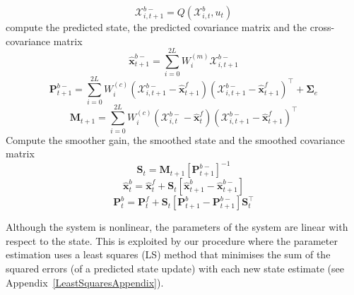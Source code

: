 \documentclass[twocolumn,11pt,a4paper]{article}		%
\begin{document}
\begin{algorithm}
\begin{small}
\begin{algorithmic}[1]
		\begin{equation*}
			\mathcal X_{i,t+1}^{b-}=Q(\mathcal X_{i,t}^b,u_t) 
		\end{equation*}
		 compute the predicted state, the predicted covariance matrix and the cross-covariance matrix
		\begin{equation*}
			\hat{\mathbf x}_{t+1}^{b-}=\sum_{i=0}^{2L} W_i^{(m)}\mathcal X_{i,t+1}^{b-} 
		\end{equation*}
		\begin{equation*}
			\mathbf P_{t +1}^{b-}=\sum_{i=0}^{2L} W_i^{(c)}(\mathcal X_{i,t+1}^{b-}-\hat{\mathbf x}_{t +1}^{f})(\mathcal X_{i,t+1}^{b-}-\hat{\mathbf x}_{t +1}^{f})^\top+\boldsymbol \Sigma_e 
		\end{equation*}
		\begin{equation*}
			\mathbf M_{t +1}=\sum_{i=0}^{2L} W_i^{(c)}(\mathcal X_{i,t}^{b-}-\hat{\mathbf x}_{t}^{f})(\mathcal X_{i,t+1}^{b-}-\hat{\mathbf x}_{t+1}^{f})^\top 
		\end{equation*}
		 Compute the smoother gain, the smoothed state and the smoothed covariance matrix
		\begin{equation*}
			\mathbf S_t=\mathbf M_{t +1}\left[ \mathbf P_{t +1}^{b-}\right] ^{-1} 
		\end{equation*}
		\begin{equation*}
			\hat{\mathbf x}_t^b=\hat{\mathbf x}_t^f+\mathbf S_t\left[\hat{\mathbf x}_{t+1}^{b}-\hat{\mathbf x}_{t+1}^{b-}\right] 
		\end{equation*}
		\begin{equation*}
			\mathbf P_{t}^{b}=\mathbf P_{t}^{f}+\mathbf S_t\left[\mathbf P_{t+1}^{b}-\mathbf P_{t+1}^{b-} \right]\mathbf S_t^\top 
		\end{equation*}
	\end{algorithmic}
\end{small}
\end{algorithm}

Although the system is nonlinear, the parameters of the system are linear with respect to the state. This is exploited by our procedure where the parameter estimation uses a least squares (LS) method that minimises the sum of the squared errors (of a predicted state update) with each new state estimate (see Appendix~\ref{LeastSquaresAppendix}).
\end{document}
